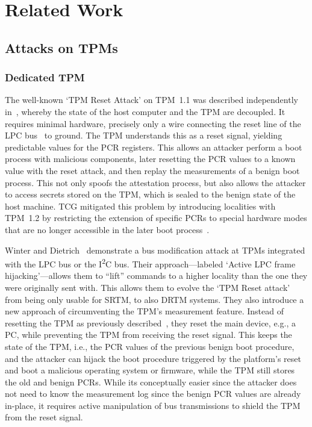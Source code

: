 
\chapter{Related Work}\label{chapter:related_work}

\section{Attacks on TPMs}

\subsection{Dedicated TPM}

The well-known `TPM Reset Attack' on TPM~1.1 was described independently in~\cite{kauerBernhard,sparks2007}, whereby the state of the host computer and the TPM are decoupled.
It requires minimal hardware, precisely only a wire connecting the reset line of the LPC bus~\cite{lpc} to ground.
The TPM understands this as a reset signal, yielding predictable values for the \ac{PCR} registers.
This allows an attacker perform a boot process with malicious components, later resetting the \ac{PCR} values to a known value with the reset attack, and then replay the measurements of a benign boot process.
This not only spoofs the attestation process, but also allows the attacker to access secrets stored on the TPM, which is sealed to the benign state of the host machine.
\ac{TCG} mitigated this problem by introducing localities with TPM~1.2 by restricting the extension of specific \acp{PCR} to special hardware modes that are no longer accessible in the later boot process~\cite{tpmResetMitigation}.

Winter and Dietrich~\cite{Winter2013} demonstrate a bus modification attack at TPMs integrated with the LPC bus or the I\textsuperscript{2}C bus.
Their approach---labeled `Active LPC frame hijacking'---allows them to ``lift'' commands to a higher locality than the one they were originally sent with.
This allows them to evolve the `TPM Reset attack' from being only usable for \ac{SRTM}, to also \ac{DRTM} systems.
They also introduce a new approach of circumventing the TPM's measurement feature.
Instead of resetting the TPM as previously described~\cite{kauerBernhard,sparks2007}, they reset the main device, e.g., a PC, while preventing the TPM from receiving the reset signal.
This keeps the state of the TPM, i.e., the \ac{PCR} values of the previous benign boot procedure, and the attacker can hijack the boot procedure triggered by the platform's reset and boot a malicious operating system or firmware, while the TPM still stores the old and benign PCRs.
While its conceptually easier since the attacker does not need to know the measurement log since the benign \ac{PCR} values are already in-place, it requires active manipulation of bus transmissions to shield the TPM from the reset signal.

